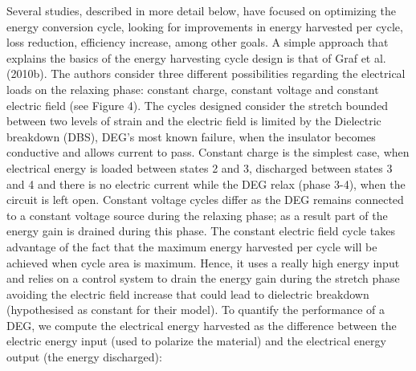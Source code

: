 	Several studies, described in more detail below, have focused on optimizing the energy conversion cycle, looking for improvements in energy harvested per cycle, loss reduction, efficiency increase, among other goals. 
A simple approach that explains the basics of the energy harvesting cycle design is that of Graf et al. (2010b). The authors consider three different possibilities regarding the electrical loads on the relaxing phase: constant charge, constant voltage and constant electric field (see Figure 4). The cycles designed consider the stretch bounded between two levels of strain and the electric field is limited by the Dielectric breakdown (DBS), DEG’s most known failure, when the insulator becomes conductive and allows current to pass.
Constant charge is the simplest case, when electrical energy is loaded between states 2 and 3, discharged between states 3 and 4 and there is no electric current while the DEG relax (phase 3-4), when the circuit is left open. Constant voltage cycles differ as the DEG remains connected to a constant voltage source during the relaxing phase; as a result part of the energy gain is drained during this phase. The constant electric field cycle takes advantage of the fact that the maximum energy harvested per cycle will be achieved when cycle area is maximum. Hence, it uses a really high energy input and relies on a control system to drain the energy gain during the stretch phase avoiding the electric field increase that could lead to dielectric breakdown (hypothesised as constant for their model). 
To quantify the performance of a DEG, we compute the electrical energy harvested as the difference between the electric energy input (used to polarize the material) and the electrical energy output (the energy discharged):

